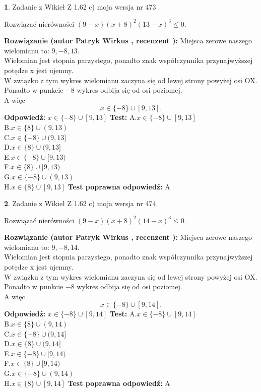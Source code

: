\documentclass[12pt, a4paper]{article}
\theoremstyle{definition} %
\newtheorem{zad}{}
\newcommand{\zadStart}[1]{\begin{zad}#1\newline}
\newcommand{\zadStop}{\end{zad}}
\newcommand{\rozwStart}[2]{\noindent \textbf{Rozwiązanie (autor #1 , recenzent #2): }\newline}
\newcommand{\rozwStop}{\newline}
\newcommand{\odpStart}{\noindent \textbf{Odpowiedź:}\newline}
\newcommand{\odpStop}{\newline}
\newcommand{\testStart}{\noindent \textbf{Test:}\newline}
\newcommand{\testStop}{\newline}
\newcommand{\kluczStart}{\noindent \textbf{Test poprawna odpowiedź:}\newline}
\newcommand{\kluczStop}{\newline}
\begin{document}
\zadStart{Zadanie z Wikieł Z 1.62 c) moja wersja nr 473}

Rozwiązać nierówności $(9-x)(x+8)^{2}(13-x)^{3}\le0$.
\zadStop
\rozwStart{Patryk Wirkus}{}
Miejsca zerowe naszego wielomianu to: $9, -8, 13$.\\
Wielomian jest stopnia parzystego, ponadto znak współczynnika przy\linebreak najwyższej potędze x jest ujemny.\\ W związku z tym wykres wielomianu zaczyna się od lewej strony powyżej osi OX.\\
Ponadto w punkcie $-8$ wykres odbija się od osi poziomej.\\
A więc $$x \in \{-8\} \cup [9,13].$$
\rozwStop
\odpStart
$x \in \{-8\} \cup [9,13]$
\odpStop
\testStart
A.$x \in \{-8\} \cup [9,13]$\\
B.$x \in \{8\} \cup (9,13)$\\
C.$x \in \{-8\} \cup (9,13]$\\
D.$x \in \{8\} \cup (9,13]$\\
E.$x \in \{-8\} \cup [9,13)$\\
F.$x \in \{8\} \cup [9,13)$\\
G.$x \in \{-8\} \cup (9,13)$\\
H.$x \in \{8\} \cup [9,13]$
\testStop
\kluczStart
A
\kluczStop



\zadStart{Zadanie z Wikieł Z 1.62 c) moja wersja nr 474}

Rozwiązać nierówności $(9-x)(x+8)^{2}(14-x)^{3}\le0$.
\zadStop
\rozwStart{Patryk Wirkus}{}
Miejsca zerowe naszego wielomianu to: $9, -8, 14$.\\
Wielomian jest stopnia parzystego, ponadto znak współczynnika przy\linebreak najwyższej potędze x jest ujemny.\\ W związku z tym wykres wielomianu zaczyna się od lewej strony powyżej osi OX.\\
Ponadto w punkcie $-8$ wykres odbija się od osi poziomej.\\
A więc $$x \in \{-8\} \cup [9,14].$$
\rozwStop
\odpStart
$x \in \{-8\} \cup [9,14]$
\odpStop
\testStart
A.$x \in \{-8\} \cup [9,14]$\\
B.$x \in \{8\} \cup (9,14)$\\
C.$x \in \{-8\} \cup (9,14]$\\
D.$x \in \{8\} \cup (9,14]$\\
E.$x \in \{-8\} \cup [9,14)$\\
F.$x \in \{8\} \cup [9,14)$\\
G.$x \in \{-8\} \cup (9,14)$\\
H.$x \in \{8\} \cup [9,14]$
\testStop
\kluczStart
A
\kluczStop
\end{document}
